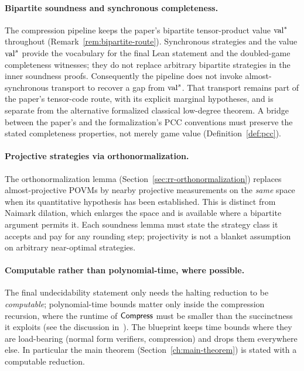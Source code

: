 \paragraph{Bipartite soundness and synchronous completeness.}
The compression pipeline keeps the paper's bipartite tensor-product value $\mathrm{val}^*$
throughout (Remark~\ref{rem:bipartite-route}). Synchronous strategies and the value
$\mathrm{val}^{s}$ provide the vocabulary for the final Lean statement and the doubled-game
completeness witnesses; they do not replace arbitrary bipartite strategies in the inner
soundness proofs. Consequently the pipeline does not invoke almost-synchronous transport
to recover a gap from $\mathrm{val}^{s}$. That transport remains part of the paper's tensor-code
route, with its explicit marginal hypotheses, and is separate from the alternative
formalized classical low-degree theorem. A bridge between the paper's and the
formalization's PCC conventions must preserve the stated completeness properties, not
merely game value (Definition~\ref{def:pcc}).

\paragraph{Projective strategies via orthonormalization.}
The orthonormalization lemma (Section~\ref{sec:rr-orthonormalization}) replaces
almost-projective POVMs by nearby projective measurements on the \emph{same} space when
its quantitative hypothesis has been established. This is distinct from Naimark dilation,
which enlarges the space and is available where a bipartite argument permits it. Each
soundness lemma must state the strategy class it accepts and pay for any rounding step;
projectivity is not a blanket assumption on arbitrary near-optimal strategies.

\paragraph{Computable rather than polynomial-time, where possible.}
The final undecidability statement only needs the halting reduction to be
\emph{computable}; polynomial-time bounds matter only inside the compression recursion,
where the runtime of $\mathsf{Compress}$ must be smaller than the succinctness it exploits (see
the discussion in~\cite{MNY}). The blueprint keeps time bounds where they are load-bearing
(normal form verifiers, compression) and drops them everywhere else. In particular the
main theorem (Section~\ref{ch:main-theorem}) is stated with a computable reduction.

